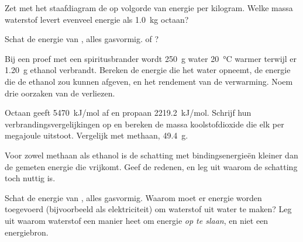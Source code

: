 \begin{exercise}[$\star\star$]\label{exo:g11:reaction-energy:10}
Zet met het staafdiagram de  op volgorde van energie per
kilogram. Welke massa waterstof levert evenveel energie als
\qty{1.0}{kg} octaan?
\end{exercise}

\begin{exercise}[$\star\star$]\label{exo:g11:reaction-energy:11}
Schat de energie van , alles gasvormig.  of
?
\end{exercise}

\begin{exercise}[$\star\star\star$]\label{exo:g11:reaction-energy:12}
Bij een proef met een spiritusbrander wordt \qty{250}{g} water
\qty{20}{\celsius} warmer terwijl er \qty{1.20}{g} ethanol verbrandt.
Bereken de energie die het water opneemt, de energie die de ethanol zou
kunnen afgeven, en het rendement van de verwarming. Noem drie oorzaken
van de verliezen.
\end{exercise}

\begin{exercise}[$\star\star\star$]\label{exo:g11:reaction-energy:13}
Octaan geeft \qty{5470}{kJ/mol} af en propaan \qty{2219.2}{kJ/mol}.
Schrijf hun verbrandingsvergelijkingen op en bereken de massa
koolstofdioxide die elk per megajoule uitstoot. Vergelijk met methaan,
\qty{49.4}{g}.
\end{exercise}

\begin{exercise}[$\star\star\star$]\label{exo:g11:reaction-energy:14}
Voor zowel methaan als ethanol is de schatting met bindingsenergieën
kleiner dan de gemeten energie die vrijkomt. Geef de redenen, en leg uit
waarom de schatting toch nuttig is.
\end{exercise}

\begin{exercise}[$\star\star\star$]\label{exo:g11:reaction-energy:15}
Schat de energie van , alles gasvormig. Waarom moet
er energie worden toegevoerd (bijvoorbeeld als elektriciteit) om
waterstof uit water te maken? Leg uit waarom waterstof een manier heet om
energie \emph{op te slaan}, en niet een energiebron.
\end{exercise}

